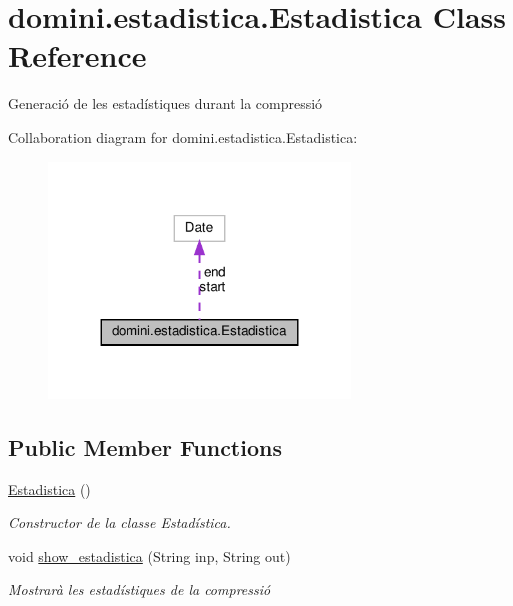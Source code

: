 \hypertarget{classdomini_1_1estadistica_1_1Estadistica}{}\section{domini.\+estadistica.\+Estadistica Class Reference}
\label{classdomini_1_1estadistica_1_1Estadistica}


Generació de les estadístiques durant la compressió  




Collaboration diagram for domini.\+estadistica.\+Estadistica\+:\nopagebreak
\begin{figure}[H]
\begin{center}
\leavevmode
\includegraphics[width=227pt]{classdomini_1_1estadistica_1_1Estadistica__coll__graph}
\end{center}
\end{figure}
\subsection*{Public Member Functions}
\begin{DoxyCompactItemize}
\item 
\hyperlink{classdomini_1_1estadistica_1_1Estadistica_a16c37d85709413fd65f8dee111faed49}{Estadistica} ()
\begin{DoxyCompactList}\small\item\em Constructor de la classe Estadística. \end{DoxyCompactList}\item 
void \hyperlink{classdomini_1_1estadistica_1_1Estadistica_a6cac6971be817fd985afb8f3b6725464}{show\+\_\+estadistica} (String inp, String out)
\begin{DoxyCompactList}\small\item\em Mostrarà les estadístiques de la compressió \end{DoxyCompactList}\end{DoxyCompactItemize}
